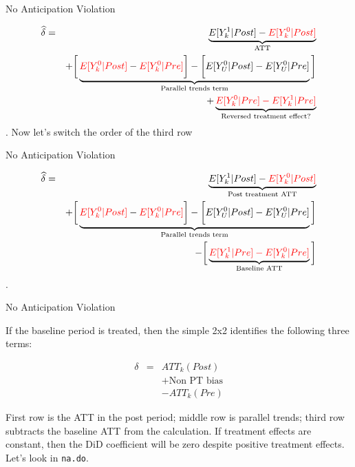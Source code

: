 \documentclass{beamer}
\begin{document}
\begin{frame}{No Anticipation Violation}

\begin{eqnarray*}
\widehat{\delta} &=& \underbrace{E[Y^1_k | Post] - \textcolor{red}{E[Y^0_k | Post]}}_{\mathclap{\text{ATT}}} \\
&& + \bigg [  \underbrace{\textcolor{red}{E[Y^0_k | Post]} - \textcolor{red}{E[Y^0_k | Pre]} \bigg ] - \bigg [ \textcolor{black}{E[Y^0_U | Post]} - E[Y_U^0 | Pre] }_{\mathclap{\text{Parallel trends term}}} \bigg ] \\
&& + \underbrace{ \textcolor{red}{E[Y^0_k|Pre] - E[Y^1_k|Pre]}}_{\mathclap{\text{Reversed treatment effect?}}}
\end{eqnarray*}. Now let's switch the order of the third row

\end{frame}

\begin{frame}{No Anticipation Violation}

\begin{eqnarray*}
\widehat{\delta} &=& \underbrace{E[Y^1_k | Post] - \textcolor{red}{E[Y^0_k | Post]}}_{\mathclap{\text{Post treatment ATT}}} \\
&& + \bigg [  \underbrace{\textcolor{red}{E[Y^0_k | Post]} - \textcolor{red}{E[Y^0_k | Pre]} \bigg ] - \bigg [ \textcolor{black}{E[Y^0_U | Post]} - E[Y_U^0 | Pre] }_{\mathclap{\text{Parallel trends term}}} \bigg ] \\
&& - \bigg [ \underbrace{ \textcolor{red}{E[Y^1_k|Pre] - E[Y^0_k|Pre]}}_{\mathclap{\text{Baseline ATT}}} \bigg ]
\end{eqnarray*}. 

\end{frame}





\begin{frame}{No Anticipation Violation}

If the baseline period is treated, then the simple 2x2 identifies the following three terms:

\begin{eqnarray*}
\delta &=& ATT_k(Post) \\&&+ \text{Non PT bias} \\&&- ATT_k(Pre)
\end{eqnarray*}

First row is the ATT in the post period; middle row is parallel trends; third row subtracts the baseline ATT from the calculation. If treatment effects are constant, then the DiD coefficient will be zero despite positive treatment effects.  Let's look in \texttt{na.do}.

\end{frame}
\end{document}
